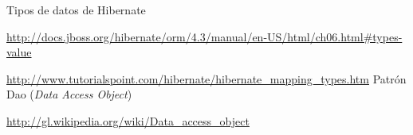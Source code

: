 \documentclass{article}
\begin{document}
\clearpage
\newpage
{\setlength{\parskip}{0mm}\listoffigures}

\clearpage

\renewcommand{\bibname}{Referencias}
\begin{thebibliography}{99}
Tipos de datos de Hibernate

\url{http://docs.jboss.org/hibernate/orm/4.3/manual/en-US/html/ch06.html\#types-value}

\url{http://www.tutorialspoint.com/hibernate/hibernate\_mapping\_types.htm}
Patrón Dao (\textit{Data Access Object})

\url{http://gl.wikipedia.org/wiki/Data_access_object}
\end{thebibliography}
\end{document}
